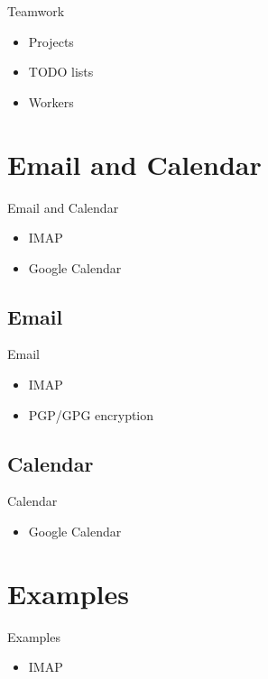 \begin{frame}{Teamwork}
\begin{itemize}
\item Projects
\item TODO lists
\item Workers
\end{itemize}
\end{frame}

\section{Email and Calendar}

\begin{frame}{Email and Calendar}
\begin{itemize}
\item IMAP
\item Google Calendar
\end{itemize}
\end{frame}

\subsection{Email}
\begin{frame}{Email}
\begin{itemize}
\item IMAP
\item PGP/GPG encryption
\end{itemize}
\end{frame}

\subsection{Calendar}
\begin{frame}{Calendar}
\begin{itemize}
\item Google Calendar
\end{itemize}
\end{frame}

\section{Examples}

\begin{frame}{Examples}
\begin{itemize}
\item IMAP

\end{itemize}
\end{frame}

